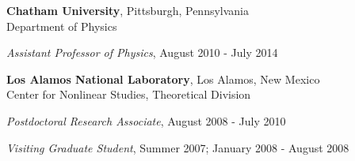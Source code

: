 

{\bf Chatham University}, Pittsburgh, Pennsylvania\\
Department of Physics
\begin{list1}
\item[] {\em  Assistant Professor of Physics}, August 2010 - July 2014
\end{list1}



{\bf Los Alamos National Laboratory}, Los Alamos, New Mexico\\
Center for Nonlinear Studies, Theoretical Division
\begin{list1}
\item[] {\em Postdoctoral Research Associate}, August 2008 - July 2010
\item[] {\em Visiting Graduate Student}, Summer 2007; January 2008 - August 2008
\end{list1}

